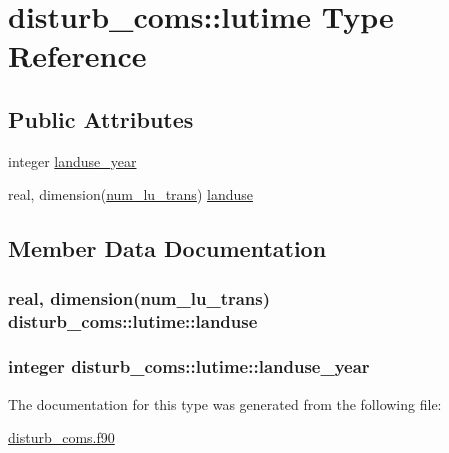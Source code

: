 \hypertarget{structdisturb__coms_1_1lutime}{}\section{disturb\+\_\+coms\+:\+:lutime Type Reference}
\label{structdisturb__coms_1_1lutime}
\subsection*{Public Attributes}
\begin{DoxyCompactItemize}
\item 
integer \hyperlink{structdisturb__coms_1_1lutime_afba2fbf3ca04baa3beedb424ebb51022}{landuse\+\_\+year}
\item 
real, dimension(\hyperlink{namespacedisturb__coms_ac39535da2e75c569a86d8f91379d75d9}{num\+\_\+lu\+\_\+trans}) \hyperlink{structdisturb__coms_1_1lutime_a807d824fe2cb6854099a8f49246617c7}{landuse}
\end{DoxyCompactItemize}


\subsection{Member Data Documentation}
\subsubsection[{\texorpdfstring{landuse}{landuse}}]{\setlength{\rightskip}{0pt plus 5cm}real, dimension({\bf num\+\_\+lu\+\_\+trans}) disturb\+\_\+coms\+::lutime\+::landuse}\hypertarget{structdisturb__coms_1_1lutime_a807d824fe2cb6854099a8f49246617c7}{}\label{structdisturb__coms_1_1lutime_a807d824fe2cb6854099a8f49246617c7}
\subsubsection[{\texorpdfstring{landuse\+\_\+year}{landuse_year}}]{\setlength{\rightskip}{0pt plus 5cm}integer disturb\+\_\+coms\+::lutime\+::landuse\+\_\+year}\hypertarget{structdisturb__coms_1_1lutime_afba2fbf3ca04baa3beedb424ebb51022}{}\label{structdisturb__coms_1_1lutime_afba2fbf3ca04baa3beedb424ebb51022}


The documentation for this type was generated from the following file\+:\begin{DoxyCompactItemize}
\item 
\hyperlink{disturb__coms_8f90}{disturb\+\_\+coms.\+f90}\end{DoxyCompactItemize}
